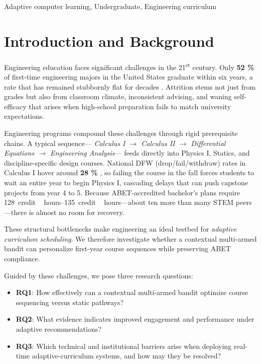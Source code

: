 \documentclass[conference]{IEEEtran}
\begin{document}
\begin{IEEEkeywords}
Adaptive computer learning, Undergraduate, Engineering curriculum
\end{IEEEkeywords}

\section{Introduction and Background}

Engineering education faces significant challenges in the 21\textsuperscript{st} century.  Only \textbf{52 \%} of first-time engineering majors in the United States graduate within six years, a rate that has remained stubbornly flat for decades \cite{geisinger2013}.  Attrition stems not just from grades but also from classroom climate, inconsistent advising, and waning self-efficacy that arises when high-school preparation fails to match university expectations.

Engineering programs compound these challenges through rigid prerequisite chains.  A typical sequence—
\emph{Calculus I $\rightarrow$ Calculus II $\rightarrow$ Differential Equations $\rightarrow$ Engineering Analysis}—
feeds directly into Physics I, Statics, and discipline-specific design courses.  National DFW (drop/fail/withdraw) rates in Calculus I hover around \textbf{28 \%} \cite{bressoud2013}, so failing the course in the fall forces students to wait an entire year to begin Physics I, cascading delays that can push capstone projects from year 4 to 5.  Because ABET-accredited bachelor’s plans require \SIrange{128}{135}{credit\,hours}—about ten more than many STEM peers—there is almost no room for recovery.

These structural bottlenecks make engineering an ideal testbed for \emph{adaptive curriculum scheduling}.  We therefore investigate whether a contextual multi-armed bandit can personalize first-year course sequences while preserving ABET compliance.

Guided by these challenges, we pose three research questions:
\begin{itemize}
  \item \textbf{RQ1}: How effectively can a contextual multi-armed bandit optimize course sequencing versus static pathways?
  \item \textbf{RQ2}: What evidence indicates improved engagement and performance under adaptive recommendations?
  \item \textbf{RQ3}: Which technical and institutional barriers arise when deploying real-time adaptive-curriculum systems, and how may they be resolved?
\end{itemize}
\end{document}

